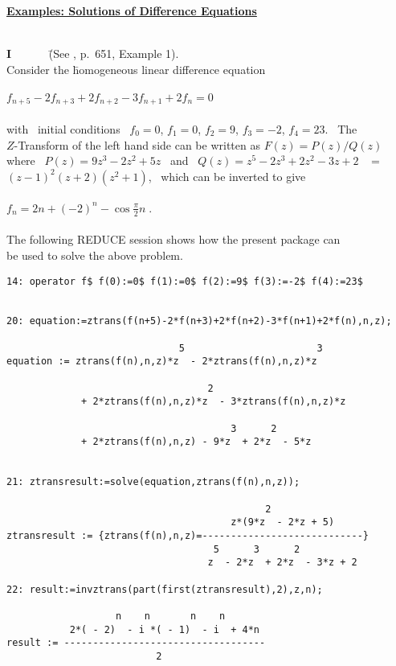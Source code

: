 \underline {{\bf Examples: Solutions of Difference Equations}}\\ \\
\begin{tabbing}
{\bf I} \ \ \ \ \ \ \=

  (See \cite{BS}, p.\ 651, Example 1).\\
  \> Consider the \= homogeneous linear difference equation\\ \\
  \>\>  $f_{n+5} - 2 f_{n+3} + 2 f_{n+2} - 3 f_{n+1} + 2 f_{n}=0$\\ \\

  \> with \ initial conditions \ $f_0=0$, $f_1=0$, $f_2=9$, $f_3=-2$,
     $f_4=23$. \  The\\
  \> $Z$-Transform of the left hand side can be written as
     $F(z)=P(z)/Q(z)$ \\
  \> where \ $P(z)=9z^3-2z^2+5z$ \
     and \ $Q(z)=z^5-2z^3+2z^2-3z+2$ \ $=$\\
  \> $(z-1)^2(z+2)(z^2+1)$, \ which can be inverted to give\\ \\

 \>\>  $f_n = 2n + (-2)^n - \cos \frac{\pi}{2}n\;.$ \\ \\

  \> The following REDUCE session shows how the present package can
\\ \> be used to solve the above problem.

\end{tabbing}
\begin{verbatim}
14: operator f$ f(0):=0$ f(1):=0$ f(2):=9$ f(3):=-2$ f(4):=23$


20: equation:=ztrans(f(n+5)-2*f(n+3)+2*f(n+2)-3*f(n+1)+2*f(n),n,z);

                              5                       3
equation := ztrans(f(n),n,z)*z  - 2*ztrans(f(n),n,z)*z

                                   2
             + 2*ztrans(f(n),n,z)*z  - 3*ztrans(f(n),n,z)*z

                                       3      2
             + 2*ztrans(f(n),n,z) - 9*z  + 2*z  - 5*z


21: ztransresult:=solve(equation,ztrans(f(n),n,z));

                                             2
                                       z*(9*z  - 2*z + 5)
ztransresult := {ztrans(f(n),n,z)=----------------------------}
                                    5      3      2
                                   z  - 2*z  + 2*z  - 3*z + 2

22: result:=invztrans(part(first(ztransresult),2),z,n);

                   n    n       n    n
           2*( - 2)  - i *( - 1)  - i  + 4*n
result := -----------------------------------
                          2

\end{verbatim}


